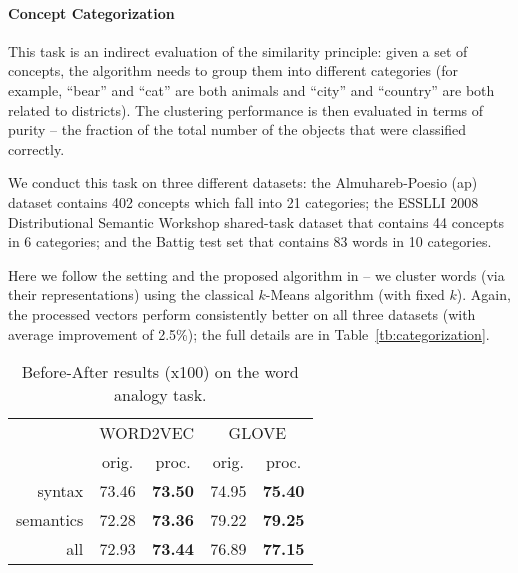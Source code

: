 \documentclass{article} \usepackage{acl2017,times}
\begin{document}
\paragraph{Concept Categorization}

This task is an indirect evaluation of the similarity principle: given a set of concepts, the algorithm needs to group them into different categories (for example, ``bear'' and ``cat'' are both animals and ``city'' and ``country'' are both related to districts). The clustering performance is then evaluated in terms of purity \citep{manning2008introduction} -- the fraction of the total number of the objects that were classified correctly.  


We conduct this task on three different datasets: the Almuhareb-Poesio (ap) dataset \citep{almuhareb2006attributes} contains 402 concepts which fall into 21 categories; the ESSLLI 2008 Distributional Semantic Workshop shared-task dataset \citep{baroni2008bridging} that contains 44 concepts in 6 categories; and the Battig test set \citep{baroni2010distributional} that contains 83 words in 10 categories. 

Here we follow the setting and the proposed algorithm in \citep{baroni2014don,schnabel2015evaluation} --   we cluster words (via their representations)  using the classical $k$-Means algorithm (with fixed $k$).
Again, the processed vectors perform consistently better on all three datasets (with average improvement of 2.5\%); the full details are in   Table~\ref{tb:categorization}.

\begin{wraptable}{l}{0.48\textwidth}
\vspace{-10pt}
\begin{tabular}{|r||c|c||c|c|}
\hline
\multirow{2}{*}{} & \multicolumn{2}{c||}{WORD2VEC} & \multicolumn{2}{c|}{GLOVE} \\ \cline{2-5} 
                  & orig.      & proc.     & orig.    & proc.    \\ \hline
syntax &     73.46 &      \bf 73.50 &  74.95   & \bf 75.40   \\ \hline
semantics &     72.28 &    \bf  73.36 &   79.22  & \bf 79.25  \\ \hline
all  &     72.93 &    \bf 73.44 &   76.89  & \bf 77.15  \\ \hline
\end{tabular}
\caption{Before-After results (x100) on the word analogy task.}
\label{tb:analogy}
\vspace{-10pt}
\end{wraptable}
\end{document}
